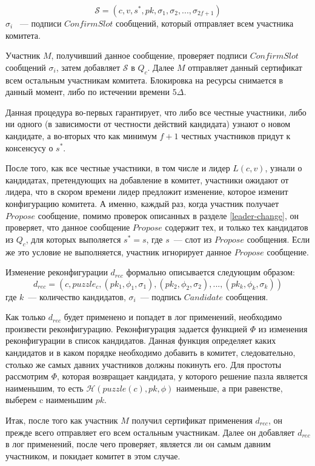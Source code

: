 $$\mathcal{S}=(c, v, s^{*}, pk, \sigma_1, \sigma_2,..., \sigma_{2f+1})$$
$\sigma_i$ ~--- подписи $ConfirmSlot$ сообщений, который отправляет всем участника комитета.

Участник $M$, получивший данное сообщение, проверяет подписи $ConfirmSlot$ сообщений $\sigma_i$, затем добавляет $\mathcal{S}$ в $Q_c$. 
Далее $M$ отправляет данный сертификат всем остальным участникам комитета.
Блокировка на ресурсы снимается в данный момент, либо по истечении времени $5\Delta$. 

Данная процедура во-первых гарантирует, что либо все честные участники, либо ни одного (в зависимости от честности действий кандидата) узнают о новом кандидате, а во-вторых что как минимум $f+1$ честных участников придут к консенсусу о $s^{*}$.

После того, как все честные участники, в том числе и лидер $L(c, v)$, узнали о кандидатах, претендующих на добавление в комитет, участники ожидают от лидера, что в скором времени лидер предложит изменение, которое изменит конфигурацию комитета. А именно, каждый раз, когда участник получает $Propose$ сообщение, помимо проверок описанных в  разделе \ref{leader-change}, он проверяет, что данное сообщение $Propose$ содержит тех, и только тех кандидатов из $Q_c$, для которых выполяется $s^{*} = s$, где $s$~--- слот из $Propose$ сообщения. Если же это условие не выполняется, участник игнорирует данное $Propose$ сообщение.

Изменение реконфигурации $d_{rec}$ формально описывается следующим образом:
$$d_{rec}=(c, puzzle_c, (pk_1, \phi_1, \sigma_1), (pk_2, \phi_2, \sigma_2),...,(pk_k, \phi_k, \sigma_k))$$
где $k$~--- количество кандидатов, $\sigma_i$~--- подпись $Candidate$ сообщения.

Как только $d_{rec}$ будет применено и попадет в лог применений, необходимо произвести реконфигурацию.
Реконфигурация задается функцией $\Phi$ из изменения реконфигурации в список кандидатов. Данная функция определяет каких кандидатов и в каком порядке необходимо добавить в комитет, следовательно, столько же самых давних участников должны покинуть его. Для простоты рассмотрим $\Phi$, которая возвращает кандидата, у которого решение пазла является наименьшим, то есть $\mathcal{H}(puzzle(c), pk, \phi)$ наименьше, а при равенстве, выберем c наименьшим $pk$.

Итак, после того как участник $M$ получил сертификат применения $d_{rec}$, он прежде всего отправляет его всем остальным участникам.
Далее он добавляет $d_{rec}$ в лог применений, после чего проверяет, является ли он самым давним участником, и покидает комитет в этом случае.

